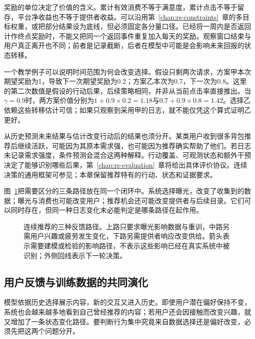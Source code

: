 奖励的单位决定了价值的含义。累计有效消费不等于满意度，累计点击不等于留存，平台净收益也不等于提供者收益。可以沿用第~\ref{chap:rs-constraints}~章的多目标权重，或把部分结果设为底线，但必须固定各分量口径。已经将一周内是否返回计作终点奖励时，不能又把同一个返回事件重复加入每天的奖励。观察窗口结束与用户真正离开也不同；前者是记录截断，后者在模型中可能是会影响未来回报的状态转移。

一个教学例子可以说明时间范围为何会改变选择。假设只剩两次请求，方案甲本次期望奖励为1，导致下一次期望奖励为0.2；方案乙本次为0.7，下一次为0.8。这里的第二次数值是假设的行动后果，后续策略相同，并非从当前点击率直接推出。当$\gamma=0.9$时，两方案价值分别为$1+0.9\times0.2=1.18$与$0.7+0.9\times0.8=1.42$。选择乙依赖这些转移估计可信；如果只观察到采用甲的日志，就不能仅凭这个算式证明乙更好。

从历史预测未来结果与估计改变行动后的结果也须分开。某类用户收到很多背包推荐后继续活跃，可能因为其原本需求强，也可能因为推荐确实帮助了他们。若日志未记录需求强度，条件预测会混合这两种解释。行动覆盖、可观测状态和额外干预决定了能够识别哪些后果，第~\ref{chap:rs-evaluation}~章将给出具体评价协议。连续决策的通用框架可参见；本章保留推荐特有的行动、状态和证据要求。

图~\ref{fig:rs-long-term-feedback}把需要区分的三条路径放在同一个闭环中。系统选择曝光，改变了收集到的数据；曝光与消费也可能改变用户；推荐机会还可能改变提供者与后续目录。它们可以同时存在，但同一种日志变化未必能判定是哪条路径在起作用。

\begin{figure}[htbp]
 \centering
 
 \caption{连续推荐的三种反馈路径。上路只要求曝光影响数据与重训，中路另需用户兴趣或疲劳发生变化，下路另需提供者响应改变供给。箭头表示需要建模或检验的影响路径，不表示这些影响已经在真实系统中被识别；外侧回线表示下一轮决策。}
 \label{fig:rs-long-term-feedback}
\end{figure}

\subsection{用户反馈与训练数据的共同演化}
\label{sec:rs-user-data-coevolution}

模型依据历史选择展示内容，新的交互又进入历史。即使用户潜在偏好保持不变，系统也会越来越多地看到自己曾经推荐的内容；若用户还会因接触而改变兴趣，就又增加了一条状态变化路径。要判断行为集中究竟来自数据选择还是偏好改变，必须先把这两个问题分开。

